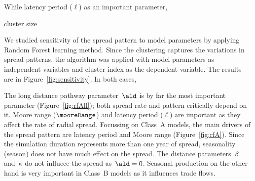 

While latency
period ($\ell$)  as an important parameter, 

cluster size

We studied sensitivity of the
spread pattern to model parameters by applying Random Forest learning
method. Since the clustering captures the variations in spread patterns,
the algorithm was applied with model parameters as independent variables
and cluster index as the dependent variable. The results are in
Figure~\ref{fig:sensitivity}. In both cases, 

The long distance pathway parameter~$\ald$ is by far the most important
parameter (Figure~\ref{fig:rfAll}); both spread rate and pattern critically
depend on it. Moore range ($\mooreRange$) and latency period ($\ell$) are
important as they affect the rate of radial spread. Focussing
on Class~A models, the main drivers of the spread pattern are latency
period and Moore range (Figure~\ref{fig:rfA}). Since the simulation
duration represents more than one year of spread, seasonality (season) does
not have much effect on the spread. The distance parameters~$\beta$
and~$\kappa$ do not influece the spread as~$\ald=0$. Seasonal production on
the other hand is very important in Class~B models as it influences trade
flows.

